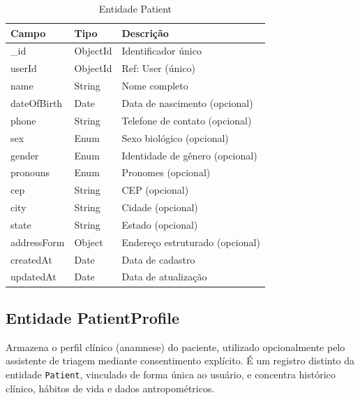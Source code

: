 \begin{table}[H]
  \centering
  \caption{Entidade Patient}
  \label{tab:entity-patient}
  \begin{tabular}{p{3.8cm}p{2.5cm}p{5.2cm}}
    \toprule
    \textbf{Campo} &
    \textbf{Tipo} &
    \textbf{Descrição} \\
    \midrule
    \_id         & ObjectId & Identificador único \\
    userId       & ObjectId & Ref: User (único) \\
    name         & String   & Nome completo \\
    dateOfBirth  & Date     & Data de nascimento (opcional) \\
    phone        & String   & Telefone de contato (opcional) \\
    sex          & Enum     & Sexo biológico (opcional) \\
    gender       & Enum     & Identidade de gênero (opcional) \\
    pronouns     & Enum     & Pronomes (opcional) \\
    cep          & String   & CEP (opcional) \\
    city         & String   & Cidade (opcional) \\
    state        & String   & Estado (opcional) \\
    addressForm  & Object   & Endereço estruturado (opcional) \\
    createdAt    & Date     & Data de cadastro \\
    updatedAt    & Date     & Data de atualização \\
    \bottomrule
  \end{tabular}
\end{table}

\subsection{Entidade PatientProfile}
\label{subsec:entity-patient-profile}

Armazena o perfil clínico (anamnese) do paciente,
utilizado opcionalmente pelo assistente de triagem
mediante consentimento explícito. É um registro
distinto da entidade \texttt{Patient}, vinculado de
forma única ao usuário, e concentra histórico
clínico, hábitos de vida e dados antropométricos.

